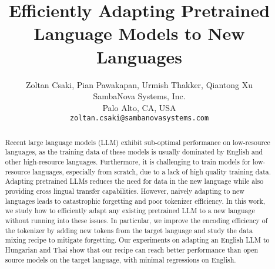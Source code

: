 \documentclass{article}
\title{Efficiently Adapting Pretrained Language Models to New Languages}
\author{%
  Zoltan Csaki, Pian Pawakapan, Urmish Thakker, Qiantong Xu \\
  SambaNova Systems, Inc. \\
  Palo Alto, CA, USA \\
  \texttt{zoltan.csaki@sambanovasystems.com} \\
}
\begin{document}
\maketitle

\vspace{-1.5em}
\begin{abstract}


Recent large language models (LLM) exhibit sub-optimal performance on low-resource languages, as the training data of these models is usually dominated by English and other high-resource languages. 
Furthermore, it is challenging to train models for low-resource languages, especially from scratch, due to a lack of high quality training data. 
Adapting pretrained LLMs reduces the need for data in the new language while also providing cross lingual transfer capabilities. However, naively adapting to new languages leads to catastrophic forgetting and poor tokenizer efficiency.
In this work, we study how to efficiently adapt any existing pretrained LLM to a new language without running into these issues.
In particular, we improve the encoding efficiency of the tokenizer by adding new tokens from the target language and study the data mixing recipe to mitigate forgetting.
Our experiments on adapting an English LLM to Hungarian and Thai show that our recipe can reach better performance than open source models on the target language, with minimal regressions on English. 


\end{abstract}
\end{document}

